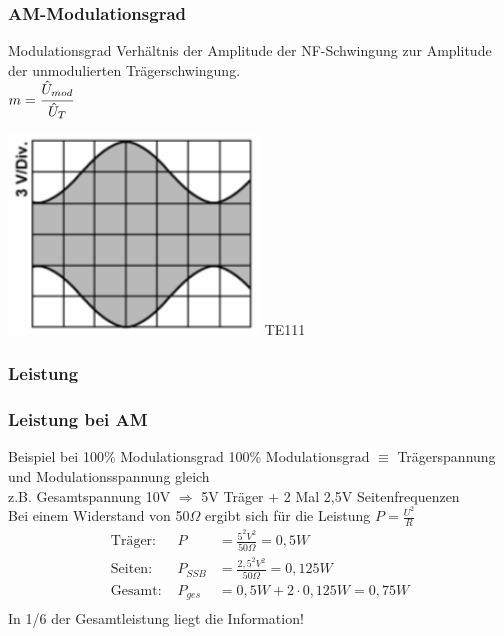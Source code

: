 \begin{frame}
  \frametitle{AM-Modulationsgrad}

  \begin{block}{Modulationsgrad}
    Verhältnis der Amplitude der NF-Schwingung zur Amplitude der unmodulierten Trägerschwingung.\\
    $m = \cfrac{\hat{U}_{mod}}{\hat{U}_T}$
  \end{block}

  \begin{center}
    \includegraphics[width=0.5\textwidth,height=.5\textheight,keepaspectratio]{a12/TE111.png}
    {\tiny TE111}
  \end{center}
\end{frame}


\subsubsection{Leistung}

\begin{frame}
  \frametitle{Leistung bei AM}
  \begin{exampleblock}{Beispiel bei 100\% Modulationsgrad}
    100\% Modulationsgrad $\equiv$ Trägerspannung und Modulationsspannung gleich\\[.5em]
    z.B. Gesamtspannung 10V $\Rightarrow$ 5V Träger + 2 Mal 2,5V Seitenfrequenzen\\[.5em]
    Bei einem Widerstand von 50$\Omega$ ergibt sich für die Leistung $P = \frac{U^2}{R}$\\[.5em]
    \begin{align*}
      \text{Träger: } & P       &= \frac{5^2V^2}{50\Omega}   = 0,5W    \\
      \text{Seiten: } & P_{SSB} &= \frac{2,5^2V^2}{50\Omega} = 0,125W \\
      \text{Gesamt: } & P_{ges} &= 0,5W + 2 \cdot 0,125W           = 0,75W  \\
    \end{align*}
    In 1/6 der Gesamtleistung liegt die Information!
  \end{exampleblock}
\end{frame}


